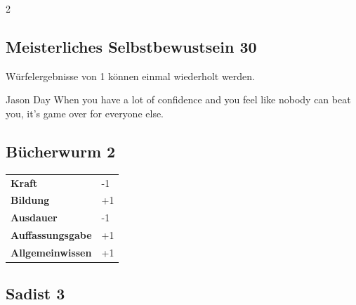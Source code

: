 \begin{multicols}{2}
\begin{tcolorbox}
    \subsection*{Meisterliches Selbstbewustsein \hfill \small{30 }}
    \tcblower
Würfelergebnisse von 1 können einmal wiederholt werden.

\begin{pquote}{Jason Day}
When you have a lot of confidence and you feel like nobody can beat you, it’s game over for everyone else.
\end{pquote}

\vspace{3mm}



\end{tcolorbox}

\begin{tcolorbox}
    \subsection*{Bücherwurm \hfill \small{2 }}
    \tcblower




\begin{tabular}{@{}ll@{}}
    \textbf{Kraft} & -1\\
    \textbf{Bildung} & +1\\
    \textbf{Ausdauer} & -1\\
    \textbf{Auffassungsgabe} & +1\\
    \textbf{Allgemeinwissen} & +1\\
\end{tabular}


\end{tcolorbox}

\begin{tcolorbox}
    \subsection*{Sadist \hfill \small{3 }}
    \tcblower





\end{tcolorbox}
\end{multicols}
